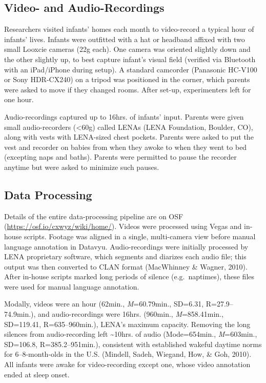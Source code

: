 \documentclass[man]{apa6}
\theoremstyle{definition}
\theoremstyle{definition}
\theoremstyle{definition}
\theoremstyle{remark}
\begin{document}
\subsection{Video- and
Audio-Recordings}\label{video--and-audio-recordings}

Researchers visited infants' homes each month to video-record a typical
hour of infants' lives. Infants were outfitted with a hat or headband
affixed with two small Looxcie cameras (22g each). One camera was
oriented slightly down and the other slightly up, to best capture
infant's visual field (verified via Bluetooth with an iPad/iPhone during
setup). A standard camcorder (Panasonic HC-V100 or Sony HDR-CX240) on a
tripod was positioned in the corner, which parents were asked to move if
they changed rooms. After set-up, experimenters left for one hour.

Audio-recordings captured up to 16hrs. of infants' input. Parents were
given small audio-recorders (\textless{}60g) called LENAs (LENA
Foundation, Boulder, CO), along with vests with LENA-sized chest
pockets. Parents were asked to put the vest and recorder on babies from
when they awoke to when they went to bed (excepting naps and baths).
Parents were permitted to pause the recorder anytime but were asked to
minimize such pauses.

\subsection{Data Processing}\label{data-processing}

Details of the entire data-processing pipeline are on OSF
(\url{https://osf.io/cxwyz/wiki/home/}). Videos were processed using
Vegas and in-house scripts. Footage was aligned in a single,
multi-camera view before manual language annotation in Datavyu.
Audio-recordings were initially processed by LENA proprietary software,
which segments and diarizes each audio file; this output was then
converted to CLAN format (MacWhinney \& Wagner, 2010). After in-house
scripts marked long periods of silence (e.g.~naptimes), these files were
used for manual language annotation.

Modally, videos were an hour (62min., \emph{M}=60.79min., SD=6.31,
R=27.9--74.9min.), and audio-recordings were 16hrs. (960min.,
\emph{M}=858.41min., SD=119.41, R=635--960min.), LENA's maximum
capacity. Removing the long silences from audio-recording left
\textasciitilde{}10hrs. of audio (Mode=654min., \emph{M}=603min.,
SD=106.8, R=385.2--951min.), consistent with established wakeful daytime
norms for 6--8-month-olds in the U.S. (Mindell, Sadeh, Wiegand, How, \&
Goh, 2010). All infants were awake for video-recording except one, whose
video annotation ended at sleep onset.
\end{document}
